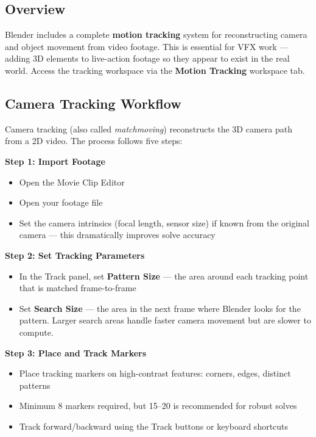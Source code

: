 \subsection{Overview}

Blender includes a complete \textbf{motion tracking} system for reconstructing camera and object movement from video footage. This is essential for VFX work --- adding 3D elements to live-action footage so they appear to exist in the real world. Access the tracking workspace via the \textbf{Motion Tracking} workspace tab.

\subsection{Camera Tracking Workflow}

Camera tracking (also called \textit{matchmoving}) reconstructs the 3D camera path from a 2D video. The process follows five steps:

\textbf{Step 1: Import Footage}
\begin{itemize}[leftmargin=2em]
  \item Open the Movie Clip Editor
  \item Open your footage file
  \item Set the camera intrinsics (focal length, sensor size) if known from the original camera --- this dramatically improves solve accuracy
\end{itemize}

\textbf{Step 2: Set Tracking Parameters}
\begin{itemize}[leftmargin=2em]
  \item In the Track panel, set \textbf{Pattern Size} --- the area around each tracking point that is matched frame-to-frame
  \item Set \textbf{Search Size} --- the area in the next frame where Blender looks for the pattern. Larger search areas handle faster camera movement but are slower to compute.
\end{itemize}

\textbf{Step 3: Place and Track Markers}
\begin{itemize}[leftmargin=2em]
  \item Place tracking markers on high-contrast features: corners, edges, distinct patterns
  \item Minimum 8 markers required, but 15--20 is recommended for robust solves
  \item Track forward/backward using the Track buttons or keyboard shortcuts
\end{itemize}

